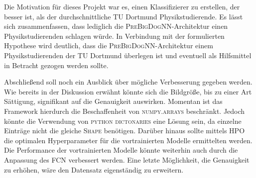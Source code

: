 Die Motivation für dieses Projekt war es, einen Klassifizierer zu erstellen,
der besser ist, als der durchschnittliche TU Dortmund Physikstudierende.
Es lässt sich zusammenfassen, dass lediglich die \textsc{PreBigDogNN}-Architektur
einen Physikstudierenden schlagen würde. In Verbindung mit
der formulierten Hypothese wird deutlich, dass die \textsc{PreBigDogNN}-Architektur
einem Physikstudierenden der TU Dortmund überlegen ist und eventuell als Hilfsmittel
in Betracht gezogen werden sollte.

Abschließend soll noch ein Ausblick über mögliche Verbesserung gegeben werden.
Wie bereits in der Diskussion erwähnt könnte sich die Bildgröße, bis zu einer
Art Sättigung, signifikant auf die Genauigkeit auswirken. Momentan ist das
Framework hierdurch die Beschaffenheit von \textsc{numpy.arrays} beschränkt.
Jedoch könnte die Verwendung von \textsc{python} \textsc{dictonaries} eine Lösung sein,
da einzelne Einträge nicht die gleiche \textsc{Shape} benötigen. Darüber hinaus sollte mittels
HPO die optimalen Hyperparameter für die vortrainierten Modelle ermittelten werden.
Die Performance der vortrainierten Modelle könnte weiterhin auch durch die Anpassung
des FCN verbessert werden. Eine letzte Möglichkeit, die Genauigkeit zu erhöhen,
wäre den Datensatz eigenständig zu erweitern.

\newpage
